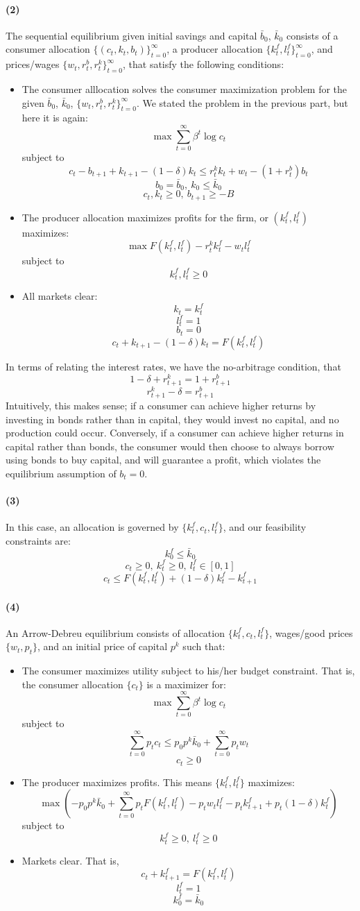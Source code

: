 \documentclass[10pt,letter]{article}
\newcommand{\problempart}[1]{\paragraph{#1}}
\begin{document}
\problempart{(2)}
The sequential equilibrium given initial savings and capital $\bar{b}_0$, $\bar{k}_0$ consists of a consumer allocation $\{ (c_t, k_t, b_t) \}_{t=0}^\infty$, a producer allocation $\{ k_t^f, l_t^f \}_{t=0}^\infty$, and prices/wages $\{ w_t, r_t^b, r_t^k \}_{t=0}^\infty$, that satisfy the following conditions:
\begin{itemize}
\item The consumer alllocation solves the consumer maximization problem for the given $\bar{b}_0$, $\bar{k}_0$, $\{ w_t, r_t^b, r_t^k \}_{t=0}^\infty$. We stated the problem in the previous part, but here it is again:
\[ \max \sum_{t=0}^\infty \beta^t \log c_t\]
subject to
\[ c_t - b_{t+1} + k_{t+1} - (1-\delta) k_t \le r_t^k k_t + w_t - (1+r_t^b )b_t \]
\[ b_0 = \bar{b}_0, \ k_0 \le \bar{k}_0 \]
\[ c_t, k_t \ge 0, \ b_{t+1} \ge -B\]
\item The producer allocation maximizes profits for the firm, or $(k_t^f, l_t^f)$ maximizes:
\[ \max F(k_t^f, l_t^f) - r_t^k k_t^f - w_tl_t^f\]
subject to
\[ k_t^f, l_t^f \ge 0 \]
\item All markets clear:
\[ k_t = k_t^f \]
\[ l_t^f = 1 \]
\[ b_t = 0 \]
\[ c_t + k_{t+1} - (1-\delta) k_t = F(k_t^f, l_t^f) \]
\end{itemize}
In terms of relating the interest rates, we have the no-arbitrage condition, that
\[ 1-\delta +r^k_{t+1} = 1+ r^b_{t+1}\]
\[ r^k_{t+1} - \delta = r^b_{t+1}\]
Intuitively, this makes sense; if a consumer can achieve higher returns by investing in bonds rather than in capital, they would invest no capital, and no production could occur. Conversely, if a consumer can achieve higher returns in capital rather than bonds, the consumer would then choose to always borrow using bonds to buy capital, and will guarantee a profit, which violates the equilibrium assumption of $b_t = 0$.
\problempart{(3)} In this case, an allocation is governed by $\{ k_t^f, c_t, l_t^f \}$, and our feasibility constraints are:
\[ k_0^f \le \bar{k}_0 \]
\[ c_t \ge 0, \ k_t^f \ge 0, \ l_t^f \in [0,1] \]
\[ c_t \le F(k_t^f, l_t^f) + (1-\delta)k_t^f - k_{t+1}^f \]
\problempart{(4)} An Arrow-Debreu equilibrium consists of allocation $\{ k_t^f, c_t, l_t^f \}$, wages/good prices $\{ w_t, p_t \}$, and an initial price of capital $p^k$ such that:
\begin{itemize}
\item The consumer maximizes utility subject to his/her budget constraint. That is, the consumer allocation $\{ c_t \}$ is a maximizer for:
\[ \max \sum_{t=0}^\infty \beta^t \log c_t  \]
subject to
\[ \sum_{t=0}^\infty p_t c_t \le p_0 p^k \bar{k}_0 + \sum_{t=0}^\infty p_t w_t \]
\[ c_t \ge 0\]
\item The producer maximizes profits. This means $\{ k_t^f, l_t^f \}$ maximizes:
\[ \max \left(-p_0 p^k \bar{k}_0 + \sum_{t=0}^\infty p_t F(k_t^f, l_t^f) - p_tw_tl_t^f - p_tk^f_{t+1} + p_t(1-\delta)k^f_t \right) \]
subject to
\[ k^f_t\ge 0, \ l^f_t \ge 0  \]
\item Markets clear. That is,
\[ c_t + k^f_{t+1} = F(k^f_t, l^f_t) \]
\[ l_t^f = 1 \]
\[ k^f_0 = \bar{k}_0 \]
\end{itemize}
\end{document}
